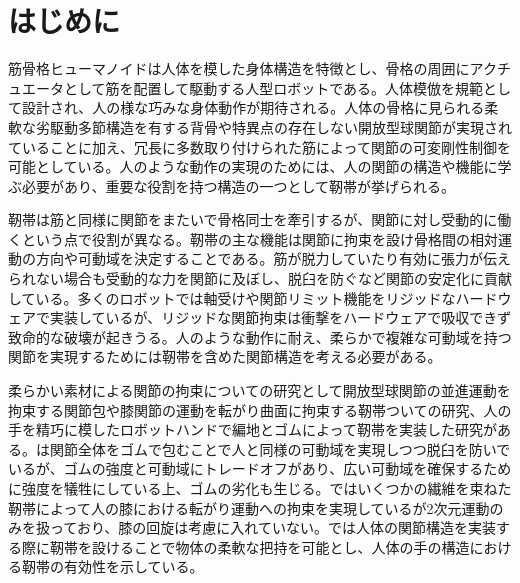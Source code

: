 \documentclass{jarticle}
\begin{document}
\date{} %

\maketitle
\thispagestyle{empty}
\pagestyle{empty}

\small
\section{はじめに}
筋骨格ヒューマノイド\cite{SR2017:asano:design}は人体を模した身体構造を特徴とし、骨格の周囲にアクチュエータとして筋を配置して駆動する人型ロボットである。人体模倣を規範として設計され、人の様な巧みな身体動作が期待される。人体の骨格に見られる柔軟な劣駆動多節構造を有する背骨や特異点の存在しない開放型球関節が実現されていることに加え、冗長に多数取り付けられた筋によって関節の可変剛性制御を可能としている。人のような動作の実現のためには、人の関節の構造や機能に学ぶ必要があり、重要な役割を持つ構造の一つとして靭帯が挙げられる。

靭帯は筋と同様に関節をまたいで骨格同士を牽引するが、関節に対し受動的に働くという点で役割が異なる。靭帯の主な機能は関節に拘束を設け骨格間の相対運動の方向や可動域を決定することである。筋が脱力していたり有効に張力が伝えられない場合も受動的な力を関節に及ぼし、脱臼を防ぐなど関節の安定化に貢献している\cite{kapandji}。多くのロボットでは軸受けや関節リミット機能をリジッドなハードウェアで実装しているが、リジッドな関節拘束は衝撃をハードウェアで吸収できず致命的な破壊が起きうる。人のような動作に耐え、柔らかで複雑な可動域を持つ関節を実現するためには靭帯を含めた関節構造を考える必要がある。

柔らかい素材による関節の拘束についての研究として開放型球関節の並進運動を拘束する関節包\cite{Biorob2018:fujii:capsule}や膝関節の運動を転がり曲面に拘束する靭帯ついての研究\cite{RoboSym:sonoda:ligaments}、人の手を精巧に模したロボットハンドで編地とゴムによって靭帯を実装した研究\cite{ICRA2016:xu:hand}がある。\cite{Biorob2018:fujii:capsule}は関節全体をゴムで包むことで人と同様の可動域を実現しつつ脱臼を防いでいるが、ゴムの強度と可動域にトレードオフがあり、広い可動域を確保するために強度を犠牲にしている上、ゴムの劣化も生じる。\cite{RoboSym:sonoda:ligaments}ではいくつかの繊維を束ねた靭帯によって人の膝における転がり運動への拘束を実現しているが2次元運動のみを扱っており、膝の回旋は考慮に入れていない。\cite{ICRA2016:xu:hand}では人体の関節構造を実装する際に靭帯を設けることで物体の柔軟な把持を可能とし、人体の手の構造における靭帯の有効性を示している。
\end{document}

